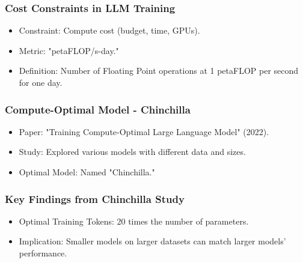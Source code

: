 \begin{frame}[fragile]\frametitle{Cost Constraints in LLM Training}

  \begin{itemize}
    \item Constraint: Compute cost (budget, time, GPUs).
    \item Metric: "petaFLOP/s-day."
    \item Definition: Number of Floating Point operations at 1 petaFLOP per second for one day.
  \end{itemize}
\end{frame}

\begin{frame}[fragile]\frametitle{Compute-Optimal Model - Chinchilla}

  \begin{itemize}
    \item Paper: "Training Compute-Optimal Large Language Model" (2022).
    \item Study: Explored various models with different data and sizes.
    \item Optimal Model: Named "Chinchilla."
  \end{itemize}
\end{frame}

\begin{frame}[fragile]\frametitle{Key Findings from Chinchilla Study}

  \begin{itemize}
    \item Optimal Training Tokens: 20 times the number of parameters.
    \item Implication: Smaller models on larger datasets can match larger models' performance.
  \end{itemize}
\end{frame}
